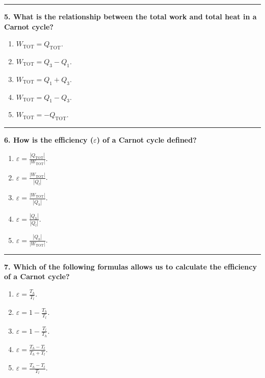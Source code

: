 \documentclass[
  9pt,
]{extbook}
\providecommand{\tightlist}{%
  \setlength{\itemsep}{0pt}\setlength{\parskip}{0pt}}
\theoremstyle{definition}
\theoremstyle{definition}
\theoremstyle{definition}
\theoremstyle{remark}
\begin{document}
\begin{center}\rule{0.5\linewidth}{0.5pt}\end{center}

\textbf{5. What is the relationship between the total work and total heat in a Carnot cycle?}

\begin{enumerate}
\def\labelenumi{\alph{enumi}.}
\tightlist
\item
  \(W_{\text{TOT}} = Q_{\text{TOT}}\).
\item
  \(W_{\text{TOT}} = Q_3 - Q_1\).
\item
  \(W_{\text{TOT}} = Q_1 + Q_3\).
\item
  \(W_{\text{TOT}} = Q_1 - Q_3\).
\item
  \(W_{\text{TOT}} = -Q_{\text{TOT}}\).
\end{enumerate}

\begin{center}\rule{0.5\linewidth}{0.5pt}\end{center}

\textbf{6. How is the efficiency (\(\varepsilon\)) of a Carnot cycle defined?}

\begin{enumerate}
\def\labelenumi{\alph{enumi}.}
\tightlist
\item
  \(\varepsilon = \frac{|Q_{\text{TOT}}|}{|W_{\text{TOT}}|}\).
\item
  \(\varepsilon = \frac{|W_{\text{TOT}}|}{|Q_l|}\).
\item
  \(\varepsilon = \frac{|W_{\text{TOT}}|}{|Q_h|}\).
\item
  \(\varepsilon = \frac{|Q_h|}{|Q_l|}\).
\item
  \(\varepsilon = \frac{|Q_h|}{|W_{\text{TOT}}|}\).
\end{enumerate}

\begin{center}\rule{0.5\linewidth}{0.5pt}\end{center}

\textbf{7. Which of the following formulas allows us to calculate the efficiency of a Carnot cycle?}

\begin{enumerate}
\def\labelenumi{\alph{enumi}.}
\tightlist
\item
  \(\varepsilon = \frac{T_h}{T_l}\).
\item
  \(\varepsilon = 1 - \frac{T_h}{T_l}\).
\item
  \(\varepsilon = 1 - \frac{T_l}{T_h}\).
\item
  \(\varepsilon = \frac{T_h - T_l}{T_h + T_l}\).
\item
  \(\varepsilon = \frac{T_h - T_l}{T_l}\).
\end{enumerate}
\end{document}
